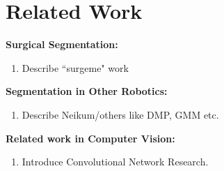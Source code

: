 \section{Related Work}

\noindent\textbf{Surgical Segmentation: }

\begin{enumerate}
\item Describe ``surgeme" work
\end{enumerate}

\noindent\textbf{Segmentation in Other Robotics: }

\begin{enumerate}
\item Describe Neikum/others like DMP, GMM etc.
\end{enumerate}

\noindent\textbf{Related work in Computer Vision: }

\begin{enumerate}
\item Introduce Convolutional Network Research.
\end{enumerate}

